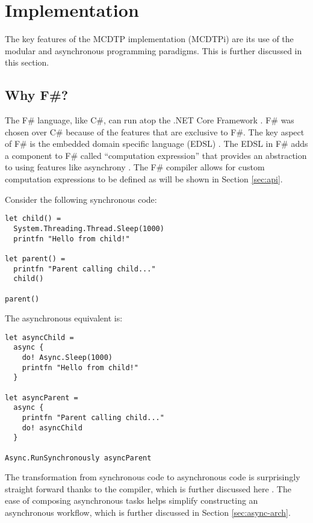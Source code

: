 \chapter{Implementation}\label{chp:impl}

The key features of the MCDTP implementation (MCDTPi) are its use of the modular and asynchronous programming paradigms. This is further discussed in this section.

\section{Why F\#?}

The F\# language, like C\#, can run atop the .NET Core Framework \cite{Leijen2009}\cite{syme2011f}. F\# was chosen over C\# because of the features that are exclusive to F\#. The key aspect of F\# is the embedded domain specific language (EDSL) \cite{syme2011f}. The EDSL in F\# adds a component to F\# called ``computation expression'' that provides an abstraction to using features like asynchrony \cite{syme2011f}. The F\# compiler allows for custom computation expressions to be defined as will be shown in Section \ref{sec:api}.

Consider the following synchronous code:

\begin{lstlisting}[caption=Synchronous F\# Example,label={lst:sync}]
let child() =
  System.Threading.Thread.Sleep(1000)
  printfn "Hello from child!"

let parent() =
  printfn "Parent calling child..."
  child()

parent()
\end{lstlisting}

The asynchronous equivalent is:

\begin{lstlisting}[caption=Asynchronous F\# Example,label={lst:async}]
let asyncChild =
  async {
    do! Async.Sleep(1000)
    printfn "Hello from child!"
  }

let asyncParent =
  async {
    printfn "Parent calling child..."
    do! asyncChild
  }

Async.RunSynchronously asyncParent
\end{lstlisting}

The transformation from synchronous code to asynchronous code is surprisingly straight forward thanks to the compiler, which is further discussed here \cite{syme2011f}. The ease of composing asynchronous tasks helps simplify constructing an asynchronous workflow, which is further discussed in Section \ref{sec:async-arch}.

